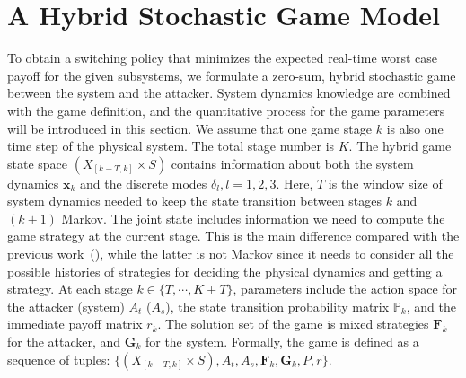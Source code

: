 \section{A Hybrid Stochastic Game Model}
\label{sec:game_form}
To obtain a switching policy that minimizes the expected real-time worst case payoff for the given subsystems, 
we formulate a zero-sum, hybrid stochastic game between the system and the attacker. System dynamics knowledge are combined with the game definition, and the quantitative process for the game parameters will be introduced in this section. We assume that one game stage $k$ is also one time step of the physical system. The total stage number is $K$. The hybrid game state space $(X_{[k-T,k]}\times S)$ contains information about both the system dynamics $\mathbf{x}_k$ and the discrete modes $\delta_l, l=1,2,3$. Here, $T$ is the window size of system dynamics needed to keep the state transition between stages $k$ and $(k+1)$ Markov. The joint state includes information we need to compute the game strategy at the current stage. This is the main difference compared with the previous work~(\cite{cdc_replay}), while the latter is not Markov since it needs to consider all the possible histories of strategies for deciding the physical dynamics and getting a strategy. At each stage $k \in \{T,\cdots, K+T\}$, parameters include the action space for the attacker (system) $A_{t}$ ($A_{s}$), the state transition probability matrix $\mathbb{P}_{k}$, and the immediate payoff matrix $r_{k}$. The solution set of the game is mixed strategies $\mathbf{F}_{k}$ for the attacker, and $\mathbf{G}_{k}$ for the system. Formally, the game is defined as a sequence of tuples:
 $\{(X_{[k-T,k]} \times S),A_{t},A_{s}, \mathbf{F}_{k},\mathbf{G}_{k}, P, r\}$.

